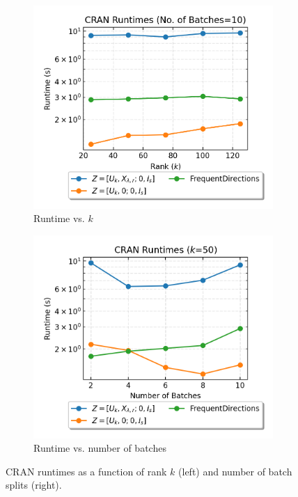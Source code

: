 \begin{figure}[h]
  \centering
  \begin{subfigure}[b]{0.49\textwidth}
    \centering
    \includegraphics[width=\textwidth]{../openreview/figures/report_figures/CRAN_runtimes_batch_split_10.png}
    \caption{Runtime vs. $k$}
  \end{subfigure}
  \hfill
  \begin{subfigure}[b]{0.49\textwidth}
    \centering
    \includegraphics[width=\textwidth]{../openreview/figures/report_figures/CRAN_runtimes_k_dim_50.png}
    \caption{Runtime vs. number of batches}
  \end{subfigure}
  \caption{CRAN runtimes as a function of rank $k$ (left) and number of batch splits (right).}
  \label{fig:cran_runtime}
\end{figure}
